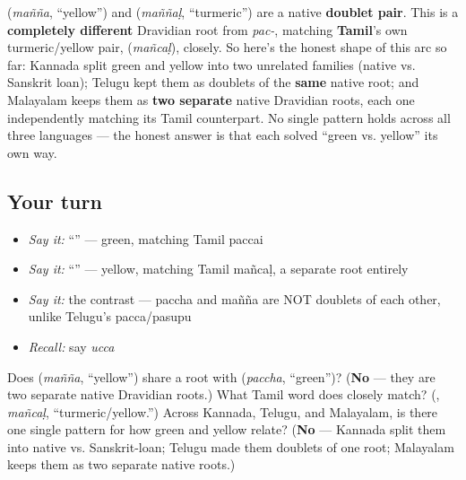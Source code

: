 \begin{culture}
\textbf{} (\emph{mañña}, \textquotedblleft{}yellow\textquotedblright{}) and \textbf{} (\emph{maññaḷ}, \textquotedblleft{}turmeric\textquotedblright{}) are a native \textbf{doublet pair}. This is a \textbf{completely different} Dravidian root from \emph{pac-}, matching \textbf{Tamil}'s own turmeric/yellow pair, \textbf{} (\emph{mañcaḷ}), closely. So here's the honest shape of this arc so far: Kannada split green and yellow into two unrelated families (native vs. Sanskrit loan); Telugu kept them as doublets of the \textbf{same} native root; and Malayalam keeps them as \textbf{two separate} native Dravidian roots, each one independently matching its Tamil counterpart. No single pattern holds across all three languages — the honest answer is that each solved \textquotedblleft{}green vs. yellow\textquotedblright{} its own way.
\end{culture}

\subsection*{Your turn}
\begin{itemize}
\raggedright
  \item \emph{Say it:} \textquotedblleft{}\textquotedblright{} — green, matching Tamil paccai
  \item \emph{Say it:} \textquotedblleft{}\textquotedblright{} — yellow, matching Tamil mañcaḷ, a separate root entirely
  \item \emph{Say it:} the contrast — paccha and mañña are NOT doublets of each other, unlike Telugu's pacca/pasupu
  \item \emph{Recall:} say \emph{ucca}
\end{itemize}

\begin{tcolorbox}[breakable,colback=teal!4,colframe=teal!35!black,title={Before you move on}]
Does \textbf{} (\emph{mañña}, \textquotedblleft{}yellow\textquotedblright{}) share a root with \textbf{} (\emph{paccha}, \textquotedblleft{}green\textquotedblright{})? (\textbf{No} — they are two separate native Dravidian roots.) What Tamil word does \textbf{} closely match? (\textbf{}, \emph{mañcaḷ}, \textquotedblleft{}turmeric/yellow.\textquotedblright{}) Across Kannada, Telugu, and Malayalam, is there one single pattern for how green and yellow relate? (\textbf{No} — Kannada split them into native vs. Sanskrit-loan; Telugu made them doublets of one root; Malayalam keeps them as two separate native roots.)
\end{tcolorbox}

